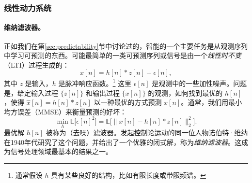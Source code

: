 \documentclass[../../book-main_zh.tex]{subfiles}
\begin{document}

\subsubsection{线性动力系统}
\label{sec:linear-systems}

\paragraph{维纳滤波器。}

正如我们在第\ref{sec:predictability}节中讨论过的，智能的一个主要任务是从观测序列中学习可预测的东西。可能最简单的一类可预测序列或信号是由一个{\em 线性时不变}（LTI）过程生成的：
\begin{equation}
    x[n] = h[n]*z[n] + \epsilon[n], 
    \label{eqn:Wiener-model}
\end{equation}
其中 $z$ 是输入，$h$ 是脉冲响应函数。\footnote{通常假设 $h$ 具有某些良好的结构，比如有限长度或带限频谱。} 这里 $\epsilon[n]$ 是观测中的一些加性噪声。问题是，给定输入过程 $\{z[n]\}$ 和输出过程 $\{x[n]\}$ 的观测，如何找到最优的 $h[n]$，使得 $\hat x[n] = h[n]*z[n]$ 以一种最优的方式预测 $x[n]$。通常，我们用最小均方误差（MMSE）来衡量预测的好坏：
\begin{equation}
    \min_{h} \mathbb{E} \big[\epsilon[n]^2\big] = \mathbb{E} \big[\|x[n] - h[n]*z[n]\|_2^2\big].
\end{equation}
最优解 $h[n]$ 被称为（去噪）滤波器。发起控制论运动的同一位人物诺伯特·维纳在1940年代研究了这个问题，并给出了一个优雅的闭式解，称为{\em 维纳滤波器}\cite{Wiener-1942,Wiener-1949}。这成为信号处理领域最基本的结果之一。
\end{document}
